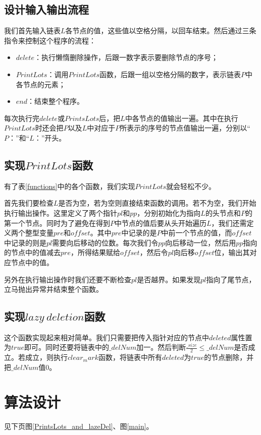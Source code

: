 \documentclass[UTF8]{ctexart}
\begin{document}
		
		\subsection{设计输入输出流程}\label{design_input_and_output}
		\indent 我们首先输入链表$L$各节点的值，这些值以空格分隔，以回车结束。然后通过三条指令来控制这个程序的流程：
			\begin{itemize}[leftmargin=50pt]
			\item $delete$：执行懒惰删除操作，后跟一数字表示要删除节点的序号；
			\item $PrintLots$：调用$PrintLots$函数，后跟一组以空格分隔的数字，表示链表$P$中各节点的元素；
			\item $end$：结束整个程序。
			\end{itemize}
			
		\indent 每次执行完$delete$或$PrintsLots$后，把$L$中各节点的值输出一遍。其中在执行$PrintLots$时还会把$P$以及$L$中对应于$P$所表示的序号的节点值输出一遍，分别以“$P：$”和“$L：$”开头。
		
		\subsection{实现$PrintLots$函数}\label{PrintLots}
		\indent 有了表\ref{functions}中的各个函数，我们实现$PrintLots$就会轻松不少。
		
		\indent 首先我们要检查$L$是否为空，若为空则直接结束函数的调用。若不为空，我们开始执行输出操作。这里定义了两个指针$pl$和$pp$，分别初始化为指向$L$的头节点和$P$的第一个节点。同时为了避免在得到$P$中节点的值后要从头开始遍历$L$，我们还需定义两个整型变量$pre$和$offset$。其中$pre$中记录的是$P$中前一个节点的值，而$offset$中记录的则是$pl$需要向后移动的位数。每次我们令$pp$向后移动一位，然后用$pp$指向的节点中的值减去$pre$，所得结果赋给$offset$，然后令$pl$向后移$offset$位，输出其对应节点中的值。
		
		\indent 另外在执行输出操作时我们还要不断检查$pl$是否越界。如果发现$pl$指向了尾节点，立马抛出异常并结束整个函数。
		\subsection{实现$lazy\ deletion$函数}\label{lazy_del}
		\indent 这个函数实现起来相对简单。我们只需要把传入指针对应的节点中$deleted$属性置为$true$即可。同时还要将链表中的$\_delNum$加一。然后判断$\frac{\_size}{2} \leq \_delNum$是否成立。若成立，则执行$clear_mark$函数，将链表中所有$deleted$为$true$的节点删除，并把$\_delNum$值$0$。
	\section{算法设计}
	见下页图\ref{PrintsLots_and_lazeDel}、图\ref{main}。
\end{document}
